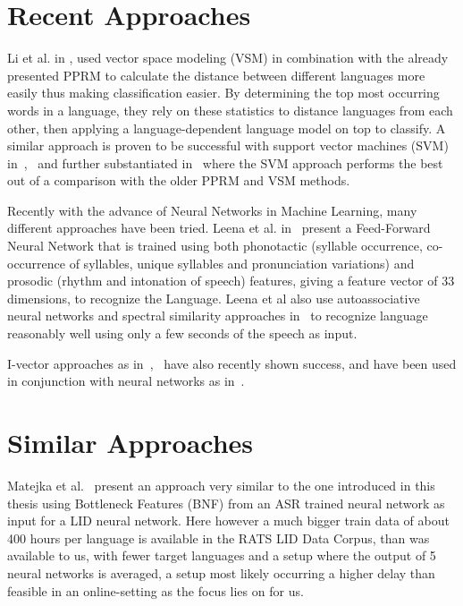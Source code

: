 \section{Recent Approaches}
Li et al. in \cite{4032773}, used vector space modeling (VSM) in combination with the already presented PPRM to calculate the distance between different languages more easily thus making classification easier. By determining the top most occurring words in a language, they rely on these statistics to distance languages from each other, then applying a language-dependent language model on top to classify. A similar approach is proven to be successful with support vector machines (SVM) in~\cite{4590023},~\cite{6289007} and further substantiated in~\cite{ma2006comparative} where the SVM approach performs the best out of a comparison with the older PPRM and VSM methods.
\par
Recently with the advance of Neural Networks in Machine Learning, many different approaches have been tried. Leena et al. in~\cite{1529486} present a Feed-Forward Neural Network that is trained using both phonotactic (syllable occurrence, co-occurrence of syllables, unique syllables and pronunciation variations) and prosodic (rhythm and intonation of speech) features, giving a feature vector of 33 dimensions, to recognize the Language. Leena et al also use autoassociative neural networks and spectral similarity approaches in~\cite{1287674} to recognize language reasonably well using only a few seconds of the speech as input.

\par

I-vector approaches as in~\cite{6680440},~\cite{d2012phonotactic} have also recently shown success, and have been used in conjunction with neural networks as in~\cite{song2015deep}.

\section{Similar Approaches}
Matejka et al.~\cite{matejka2014neural} present an approach very similar to the one introduced in this thesis using Bottleneck Features (BNF) from an ASR trained neural network as input for a LID neural network. Here however a much bigger train data of about 400 hours per language is available in the RATS LID Data Corpus, than was available to us, with fewer target languages and a setup where the output of 5 neural networks is averaged, a setup most likely occurring a higher delay than feasible in an online-setting as the focus lies on for us.

